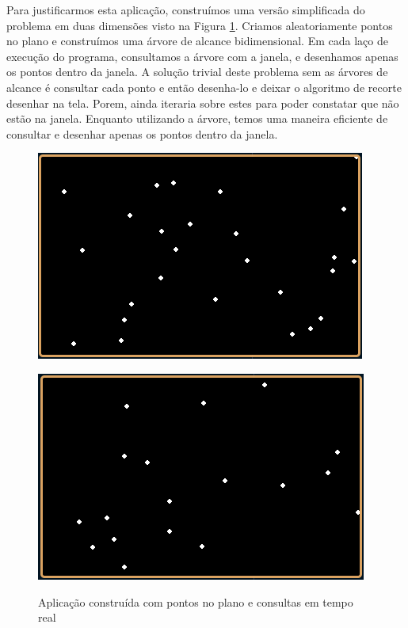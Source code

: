 Para justificarmos esta aplicação, construímos uma versão simplificada do problema em duas dimensões visto na Figura \ref{fig:application_example_dots}. Criamos aleatoriamente pontos no plano e construímos uma árvore de alcance bidimensional. Em cada laço de execução do programa, consultamos a árvore com a janela, e desenhamos apenas os pontos dentro da janela. A solução trivial deste problema sem as árvores de alcance é consultar cada ponto e então desenha-lo e deixar o algoritmo de recorte \cite{folley01} desenhar na tela. Porem, ainda iteraria sobre estes para poder constatar que não estão na janela. Enquanto utilizando a árvore, temos uma maneira eficiente de consultar e desenhar apenas os pontos dentro da janela.

\begin{figure}[h!]
\centering
\begin{minipage}{.5\textwidth}
  \centering
  \includegraphics[width=.8\linewidth]{images/Captura de tela de 2021-04-16 11-43-23.png}
 
  \label{fig:sub1}
\end{minipage}%
\begin{minipage}{.5\textwidth}
  \centering
  \includegraphics[width=.8\linewidth]{images/Captura de tela de 2021-04-16 11-43-35.png}
  
  \label{fig:sub2}
\end{minipage}
\caption{Aplicação construída com pontos no plano e consultas em tempo real}
\label{fig:application_example_dots}
\end{figure}


